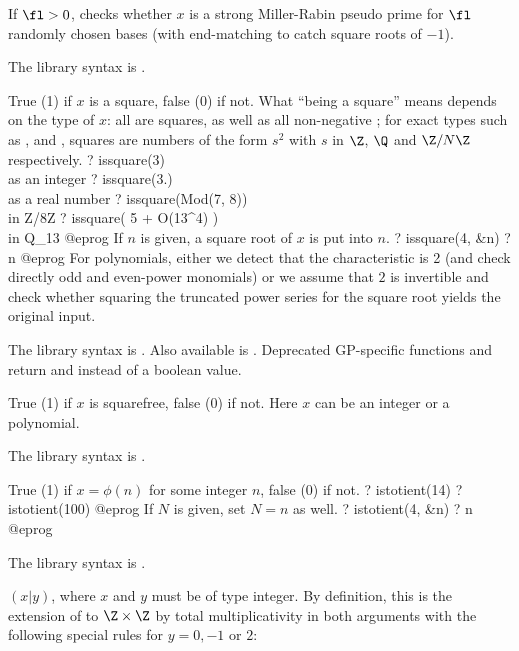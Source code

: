 If $\fl > 0$, checks whether $x$ is a strong Miller-Rabin pseudo prime  for
$\fl$ randomly chosen bases (with end-matching to catch square roots of $-1$).

The library syntax is .

\label{se:issquare}
True (1) if $x$ is a square, false (0)
if not. What ``being a square'' means depends on the type of $x$: all
 are squares, as well as all non-negative ; for
exact types such as ,  and , squares are
numbers of the form $s^2$ with $s$ in $\Z$, $\Q$ and $\Z/N\Z$ respectively.
\bprog
? issquare(3)          \\ as an integer
? issquare(3.)         \\ as a real number
? issquare(Mod(7, 8))  \\ in Z/8Z
? issquare( 5 + O(13^4) )  \\ in Q_13
@eprog
If $n$ is given, a square root of $x$ is put into $n$.
\bprog
? issquare(4, &n)
? n
@eprog
For polynomials, either we detect that the characteristic is 2 (and check
directly odd and even-power monomials) or we assume that $2$ is invertible
and check whether squaring the truncated power series for the square root
yields the original input.

The library syntax is .
Also available is . Deprecated
GP-specific functions  and
 return  and 
instead of a boolean value.

\label{se:issquarefree}
True (1) if $x$ is squarefree, false (0) if not. Here $x$ can be an
integer or a polynomial.

The library syntax is .

\label{se:istotient}
True (1) if $x = \phi(n)$ for some integer $n$, false (0)
if not.
\bprog
? istotient(14)
? istotient(100)
@eprog
If $N$ is given, set $N = n$ as well.
\bprog
? istotient(4, &n)
? n
@eprog

The library syntax is .

\label{se:kronecker}
 $(x|y)$, where $x$ and $y$ must be of type integer. By
definition, this is the extension of  to $\Z \times \Z$
by total multiplicativity in both arguments with the following special rules
for $y = 0, -1$ or $2$:

